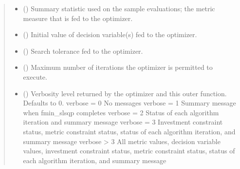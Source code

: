 \documentclass[letterpaper,10pt,english]{sphinxmanual}
\begin{document}
\begin{fulllineitems}
\begin{fulllineitems}
\begin{quote}
\begin{description}
\begin{itemize}
\item {} 
 () \textendash{} Summary statistic used on the sample evaluations; the metric measure that
is fed to the optimizer.

\item {} 
 () \textendash{} Initial value of decision variable(s) fed to the optimizer.

\item {} 
 () \textendash{} Search tolerance fed to the optimizer.

\item {} 
 () \textendash{} Maximum number of iterations the optimizer is permitted to execute.

\item {} 
 () \textendash{} Verbosity level returned by the optimizer and this outer function.
Defaults to 0.
verbose = 0     No messages
verbose = 1     Summary message when fmin\_slsqp completes
verbose = 2     Status of each algorithm iteration and summary message
verbose = 3     Investment constraint status, metric constraint status,
status of each algorithm iteration, and summary message
verbose \textgreater{} 3     All metric values, decision variable values, investment
constraint status, metric constraint status, status of
each algorithm iteration, and summary message

\end{itemize}

\end{description}\end{quote}

\end{fulllineitems}



\end{fulllineitems}
\end{document}
